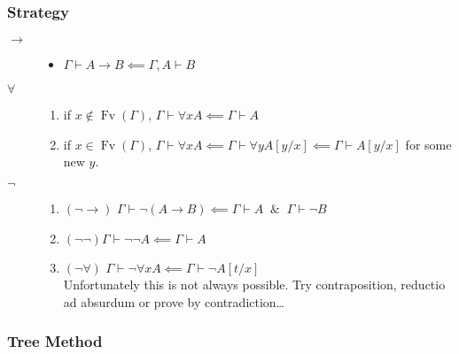 \documentclass[UTF8,11pt,colorlinks,compress,openany]{beamer}%
\begin{document}
\begin{frame}\frametitle{Strategy}
	\begin{description}
		\item[$\to$] 
		\begin{itemize}
			\item $\Gamma\vdash A\to B\impliedby\Gamma, A\vdash B$
		\end{itemize}
		\item[$\forall$]
		\begin{enumerate}
			\item if $x\notin \operatorname{Fv}(\Gamma)$, $\Gamma\vdash\forall x A\impliedby\Gamma\vdash A$
			\item if $x\in \operatorname{Fv}(\Gamma)$, $\Gamma\vdash\forall x A\impliedby\Gamma\vdash\forall y A[y/x]\impliedby\Gamma\vdash A[y/x]$ for some new $y$.
		\end{enumerate}
		\item[$\neg$]
		\begin{enumerate}
			\item $(\neg\to)$\quad
			$\Gamma\vdash\neg(A\to B)\impliedby\Gamma\vdash A\;\;\&\;\;\Gamma\vdash\neg B$
			\item $(\neg\neg)$\quad $\Gamma\vdash\neg\neg A\impliedby\Gamma\vdash A$
			\item $(\neg\forall)$\quad
			$\Gamma\vdash\neg\forall x A\impliedby\Gamma\vdash\neg A[t/x]$\\ Unfortunately this is not always possible. Try contraposition, reductio ad absurdum or prove by contradiction\dots
		\end{enumerate}
	\end{description}
\end{frame}

\subsubsection{Tree Method}
\end{document}
